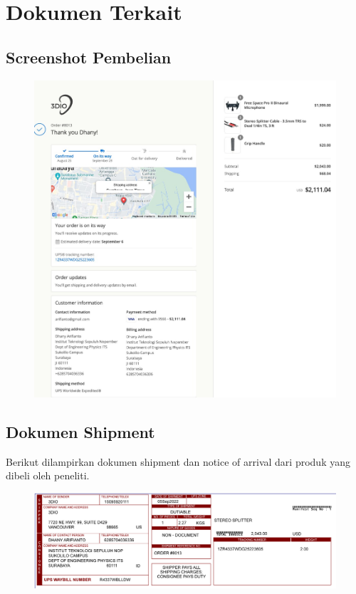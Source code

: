 \documentclass{article} %
\begin{document}
	\section{Dokumen Terkait}
	
	\subsection{Screenshot Pembelian}
	
	\begin{figure}[!ht]
		\centering
		\includegraphics[width=400pt]{images/pesan3DIO}
	\end{figure}

	\subsection{Dokumen Shipment}
	
	Berikut dilampirkan dokumen shipment dan notice of arrival dari produk yang dibeli oleh peneliti.
	
	
	
	
	\begin{figure}[!ht]
		\centering
		\includegraphics[width=400pt]{images/shipment}
	\end{figure}
\end{document}
